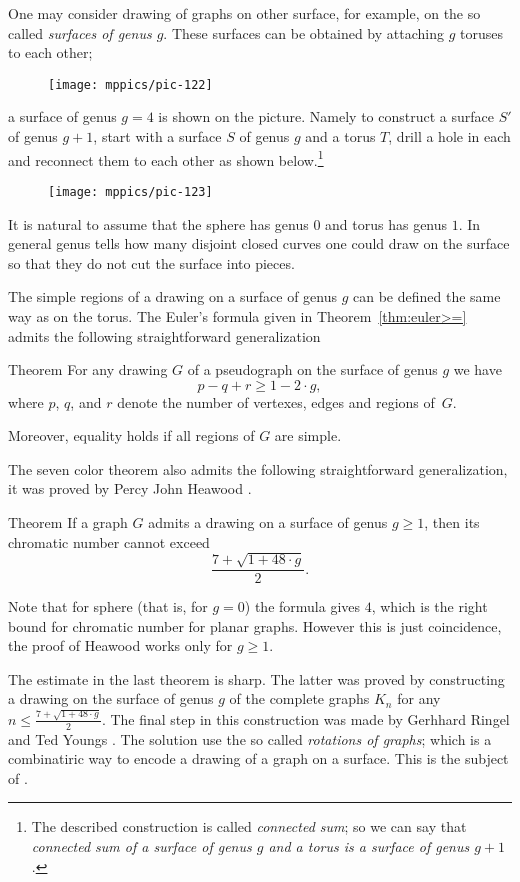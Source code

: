 One may consider drawing of graphs on other surface,
for example, on the so called \emph{surfaces of genus $g$}.
These surfaces can be obtained by attaching $g$ toruses to each other; 
\begin{figure}[h!]%
\vskip-0mm
\centering
\texttt{[image: mppics/pic-122]}
\vskip-0mm
\end{figure}
a surface of genus $g=4$ is shown on the picture.
Namely to construct a surface $S'$ of genus $g+1$, start with a surface $S$ of genus $g$ and a torus $T$, drill a hole in each and reconnect them to each other as shown below.\footnote{The described construction is called \emph{connected sum}; so we can say that \emph{connected sum of a surface of genus $g$ and a torus is a surface of genus $g+1$}.}
\begin{figure}[h!]%
\vskip-0mm
\centering
\texttt{[image: mppics/pic-123]}
\vskip-0mm
\end{figure}


It is natural to assume that the sphere has genus $0$ and torus has genus $1$.
In general genus tells how many disjoint closed curves one could draw on the surface so that they do not cut the surface into pieces.

The simple regions of a drawing on a surface of genus $g$ can be defined the same way as on the torus.
The Euler's formula given in Theorem~\ref{thm:euler>=} admits the following straightforward generalization

\begin{thm}{Theorem}\label{thm:euler>=}
For any drawing $G$ of a pseudograph on the surface of genus $g$ we have
\[p-q+r\ge 1-2\cdot g,\]
where $p$, $q$, and $r$ denote the number of vertexes, edges and regions of~$G$.

Moreover, equality holds if all regions of $G$ are simple.
\end{thm}

The seven color theorem also admits the following straightforward generalization, it was proved by Percy John Heawood \cite{heawood}.

\begin{thm}{Theorem}
If a graph $G$ admits a drawing on a surface of genus $g\ge 1$, 
then its chromatic number cannot exceed 
\[\frac{7+\sqrt{1+48\cdot g}}2.\]
\end{thm}

Note that for sphere (that is, for $g=0$) the formula gives $4$, which is the right bound for chromatic number for planar graphs. 
However this is just coincidence, the proof of Heawood works only for $g\ge 1$.

The estimate in the last theorem is sharp.
The latter was proved by constructing a drawing on the surface of genus $g$
of the complete graphs $K_n$ for any $n\le\frac{7+\sqrt{1+48\cdot g}}2$.
The final step in this construction was made by Gerhhard Ringel and Ted Youngs \cite{ringel-youngs}.
The solution use the so called \emph{rotations of graphs}; which is a combinatiric way to encode a drawing of a graph on a surface.
This is the subject of \cite[Chapter 10]{hartsfield-ringel}.


